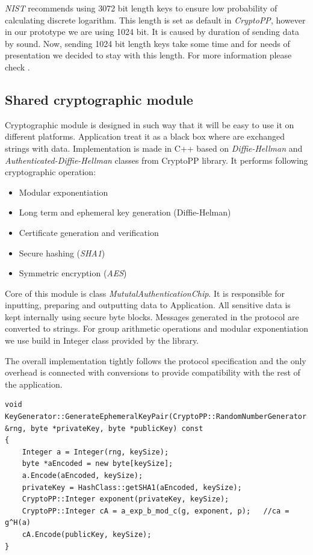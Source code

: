 \documentclass[11pt,titlepage]{article}
\theoremstyle{plain}
\begin{document}
\textit{NIST} recommends using 3072 bit length keys to ensure low probability of calculating discrete logarithm. This length is set as default in \textit{CryptoPP}, however in our prototype we are using 1024 bit. It is caused by duration of sending data by sound. Now, sending 1024 bit length keys take some time and for needs of presentation we decided to stay with this length. For more information please check \cite{NIST}.

\subsection{Shared cryptographic module}
Cryptographic module is designed in such way that it will be easy to use it on different platforms. Application treat it as a black box where are exchanged strings with data. Implementation is made in C++ based on \textit{Diffie-Hellman} and \textit{Authenticated-Diffie-Hellman} classes from CryptoPP library. It performs following cryptographic operation:

\begin{itemize}
\item Modular exponentiation
\item Long term and ephemeral key generation (Diffie-Helman)
\item Certificate generation and verification
\item Secure hashing (\textit{SHA1})
\item Symmetric encryption (\textit{AES})
\end{itemize}

Core of this module is class \textit{MututalAuthenticationChip}. It is responsible for inputting, preparing and outputting data to Application. All sensitive data is kept internally using secure byte blocks. Messages generated in the protocol are converted to strings.
For group arithmetic operations and modular exponentiation we use build in Integer class provided by the library. 

\vspace{5mm}

The overall implementation tightly follows the protocol specification and the only overhead is connected with conversions to provide compatibility with the rest of the application.
\begin{lstlisting}
void KeyGenerator::GenerateEphemeralKeyPair(CryptoPP::RandomNumberGenerator &rng, byte *privateKey, byte *publicKey) const
{
    Integer a = Integer(rng, keySize);
    byte *aEncoded = new byte[keySize];
    a.Encode(aEncoded, keySize);
    privateKey = HashClass::getSHA1(aEncoded, keySize);
    CryptoPP::Integer exponent(privateKey, keySize);
    CryptoPP::Integer cA = a_exp_b_mod_c(g, exponent, p);   //ca = g^H(a)
    cA.Encode(publicKey, keySize);
}
\end{lstlisting}
\end{document}
